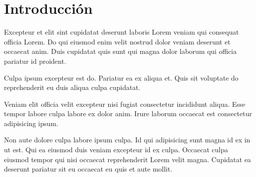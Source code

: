 \vspace*{\fill}

\section{Introducción}

  Excepteur et elit sint cupidatat deserunt laboris Lorem veniam qui consequat officia Lorem. Do qui eiusmod enim velit nostrud dolor veniam deserunt et occaecat anim. Duis cupidatat quis sunt qui magna dolor laborum qui officia pariatur id proident.

  Culpa ipsum excepteur est do. Pariatur ea ex aliqua et. Quis sit voluptate do reprehenderit eu duis aliqua culpa cupidatat.

  Veniam elit officia velit excepteur nisi fugiat consectetur incididunt aliqua. Esse tempor labore culpa labore ex dolor anim. Irure laborum occaecat est consectetur adipisicing ipsum.

  Non aute dolore culpa labore ipsum culpa. Id qui adipisicing sunt magna id ex in ut est. Qui ea eiusmod duis veniam excepteur id ex culpa. Occaecat culpa eiusmod tempor qui nisi occaecat reprehenderit Lorem velit magna. Cupidatat ea deserunt pariatur sit eu occaecat eu quis et aute mollit.

\vspace*{\fill}